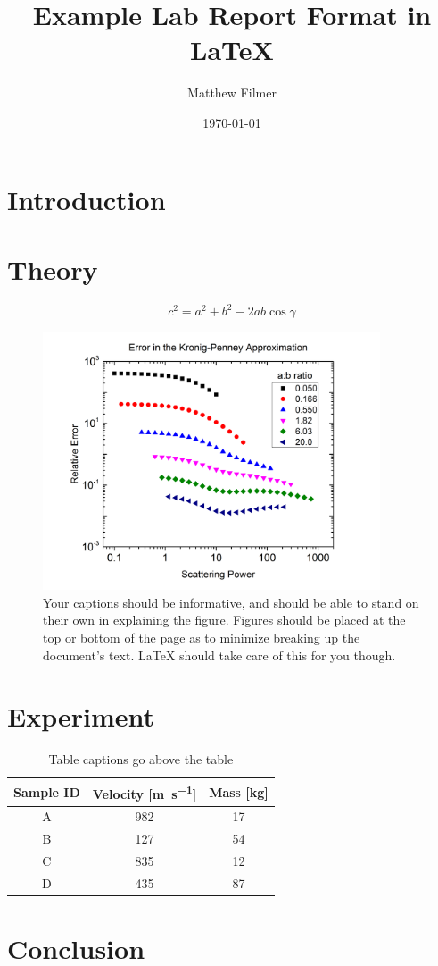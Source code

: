 \documentclass{microereport}
\author{Matthew Filmer}
\date{\today}
\title{Example Lab Report Format in \LaTeX{}}
\begin{document}
\maketitle
\begin{abstract}
	\lipsum[1]
\end{abstract}

\section{Introduction}
\lipsum[2-4]

\section{Theory}
\lipsum[5]
\begin{equation}
	c^2 = a^2 + b^2 - 2ab\cos\gamma
	\label{equ:lawOfCosines}
\end{equation}
\lipsum[6]
\begin{figure}
	\centering
	\includegraphics[width=10cm]{error}
	\caption{Your captions should be informative, and should be able to stand on their own in explaining the figure. Figures should be placed at the top or bottom of the page as to minimize breaking up the document's text. \LaTeX{} should take care of this for you though.}
	\label{fig:KPerror}
\end{figure}
\lipsum[7]

\section{Experiment}
\lipsum[8-10]
\begin{table}
	\centering
	\caption{Table captions go above the table}
	\label{tab:table}
	\begin{tabular}{ccc}
		\toprule
		Sample ID	& Velocity [\si{\meter\per\second}]	& Mass [\si{\kilo\gram}]\\
		\midrule
		A			& 982	& 17\\
		B			& 127	& 54\\
		C			& 835	& 12\\
		D			& 435	& 87\\
		\bottomrule
	\end{tabular}
\end{table}
\lipsum[11-12]

\section{Conclusion}
\lipsum[13-14]
\end{document}
